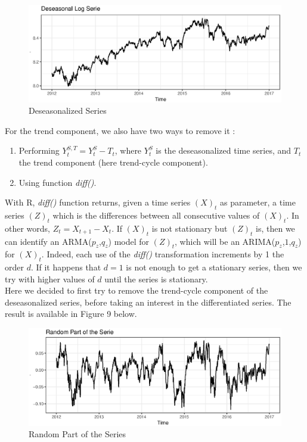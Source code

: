 \FloatBarrier
\begin{figure}[!htbp]
  \centering
  \includegraphics[width=\textwidth]{img/Fig7b.eps}
  \caption{Deseasonalized Series}
\end{figure}
\FloatBarrier

For the trend component, we also have two ways to remove it :
\begin{enumerate}
\item Performing $Y_t^{S,T} = Y_t^S - T_t$, where $Y_t^S$ is the deseasonalized time series, and $T_t$ the trend component (here trend-cycle component).
\item Using function \textit{diff()}.
\end{enumerate}

With R, \textit{diff()} function returns, given a time series $(X)_t$ as parameter, a time series $(Z)_t$ which is the differences between all consecutive values of $(X)_t$. In other words, $Z_t = X_{t+1} - X_t$. If $(X)_t$ is not stationary but $(Z)_t$ is, then we can identify an ARMA($p_z$,$q_z$) model for $(Z)_t$, which will be an ARIMA($p_z$,$1$,$q_z$) for $(X)_t$. Indeed, each use of the \textit{diff()} transformation increments by 1 the order $d$. If it happens that $d=1$ is not enough to get a stationary series, then we try with higher values of $d$ until the series is stationary. \\
Here we decided to first try to remove the trend-cycle component of the deseasonalized series, before taking an interest in the differentiated series. The result is available in Figure 9 below.

\FloatBarrier
\begin{figure}[!htbp]
  \centering
  \includegraphics[width=\textwidth]{img/Fig7c.eps}
  \caption{Random Part of the Series}
\end{figure}
\FloatBarrier

